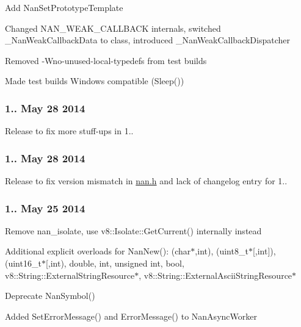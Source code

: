 \begin{DoxyItemize}
\item Add Nan\+Set\+Prototype\+Template
\item Changed N\+A\+N\+\_\+\+W\+E\+A\+K\+\_\+\+C\+A\+L\+L\+B\+A\+CK internals, switched \+\_\+\+Nan\+Weak\+Callback\+Data to class, introduced \+\_\+\+Nan\+Weak\+Callback\+Dispatcher
\item Removed -\/\+Wno-\/unused-\/local-\/typedefs from test builds
\item Made test builds Windows compatible (\textquotesingle{}Sleep()\textquotesingle{})
\end{DoxyItemize}

\subsubsection*{1.. May 28 2014}


\begin{DoxyItemize}
\item Release to fix more stuff-\/ups in 1..
\end{DoxyItemize}

\subsubsection*{1.. May 28 2014}


\begin{DoxyItemize}
\item Release to fix version mismatch in \hyperlink{nan_8h_source}{nan.\+h} and lack of changelog entry for 1..
\end{DoxyItemize}

\subsubsection*{1.. May 25 2014}


\begin{DoxyItemize}
\item Remove nan\+\_\+isolate, use v8\+::\+Isolate\+::\+Get\+Current() internally instead
\item Additional explicit overloads for Nan\+New()\+: (char$\ast$,int), (uint8\+\_\+t$\ast$\mbox{[},int\mbox{]}), (uint16\+\_\+t$\ast$\mbox{[},int), double, int, unsigned int, bool, v8\+::\+String\+::\+External\+String\+Resource$\ast$, v8\+::\+String\+::\+External\+Ascii\+String\+Resource$\ast$
\item Deprecate Nan\+Symbol()
\item Added Set\+Error\+Message() and Error\+Message() to Nan\+Async\+Worker
\end{DoxyItemize}


